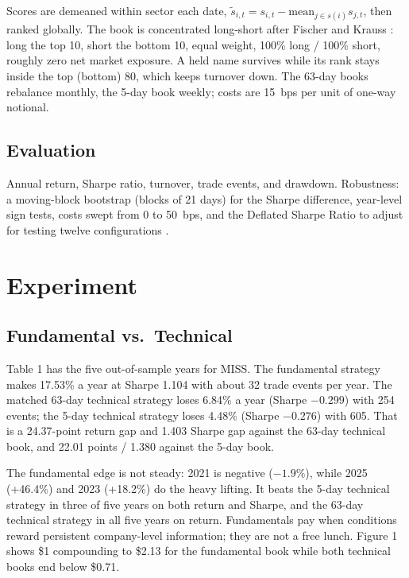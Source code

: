 \documentclass[11pt,twocolumn]{article}
\begin{document}
Scores are demeaned within sector each date,
$\tilde{s}_{i,t} = s_{i,t} - \mathrm{mean}_{j \in s(i)} s_{j,t}$, then
ranked globally. The book is concentrated long-short after Fischer and
Krauss \cite{fischer2018}: long the top 10, short the bottom 10, equal
weight, 100\% long / 100\% short, roughly zero net market exposure. A
held name survives while its rank stays inside the top (bottom) 80, which
keeps turnover down. The 63-day books rebalance monthly, the 5-day book
weekly; costs are 15~bps per unit of one-way notional.

\subsection{Evaluation}

Annual return, Sharpe ratio, turnover, trade events, and drawdown.
Robustness: a moving-block bootstrap (blocks of 21 days) for the Sharpe
difference, year-level sign tests, costs swept from 0 to 50~bps, and the
Deflated Sharpe Ratio to adjust for testing twelve configurations
\cite{bailey2014}.

\section{Experiment}

\subsection{Fundamental vs.\ Technical}

Table 1 has the five out-of-sample years for MISS. The fundamental
strategy makes 17.53\% a year at Sharpe 1.104 with about 32 trade events
per year. The matched 63-day technical strategy loses 6.84\% a year
(Sharpe $-0.299$) with 254 events; the 5-day technical strategy loses
4.48\% (Sharpe $-0.276$) with 605. That is a 24.37-point return gap and
1.403 Sharpe gap against the 63-day technical book, and 22.01 points /
1.380 against the 5-day book.

The fundamental edge is not steady: 2021 is negative ($-1.9\%$), while
2025 (+46.4\%) and 2023 (+18.2\%) do the heavy lifting. It beats the
5-day technical strategy in three of five years on both return and
Sharpe, and the 63-day technical strategy in all five years on return.
Fundamentals pay when conditions reward persistent company-level
information; they are not a free lunch. Figure 1 shows \$1 compounding
to \$2.13 for the fundamental book while both technical books end below
\$0.71.
\end{document}
